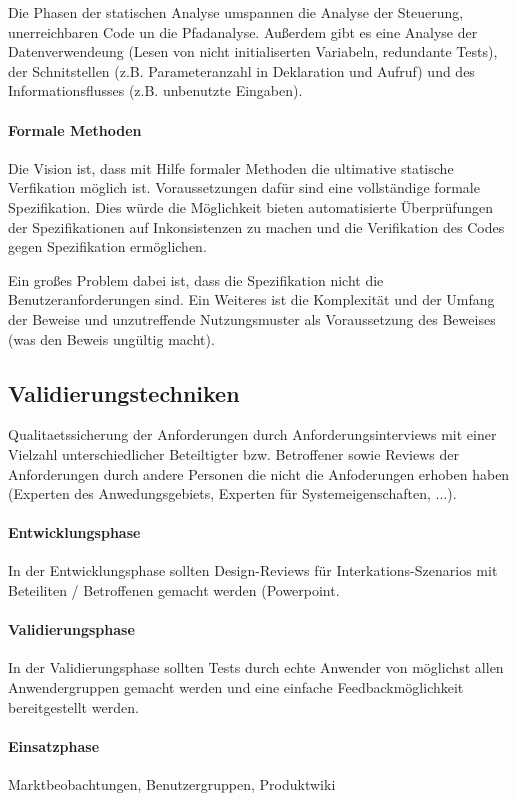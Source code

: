 Die Phasen der statischen Analyse umspannen die Analyse der Steuerung, unerreichbaren Code un die Pfadanalyse. Außerdem gibt es eine Analyse der Datenverwendeung (Lesen von nicht initialiserten Variabeln, redundante Tests), der Schnitstellen (z.B. Parameteranzahl in Deklaration und Aufruf) und des Informationsflusses (z.B. unbenutzte Eingaben).

\paragraph{Formale Methoden}
Die Vision ist, dass mit Hilfe formaler Methoden die ultimative statische Verfikation möglich ist. Voraussetzungen dafür sind eine vollständige formale Spezifikation. Dies würde die Möglichkeit bieten automatisierte Überprüfungen der Spezifikationen auf Inkonsistenzen zu machen und die Verifikation des Codes gegen Spezifikation ermöglichen.

Ein großes Problem dabei ist, dass die Spezifikation nicht die Benutzeranforderungen sind. Ein Weiteres ist die Komplexität und der Umfang der Beweise und unzutreffende Nutzungsmuster als Voraussetzung des Beweises (was den Beweis ungültig macht). 

\subsection{Validierungstechniken}
Qualitaetssicherung der Anforderungen durch Anforderungsinterviews mit einer Vielzahl unterschiedlicher Beteiltigter bzw. Betroffener sowie Reviews der Anforderungen durch andere Personen die nicht die Anfoderungen erhoben haben (Experten des Anwedungsgebiets, Experten für Systemeigenschaften, ...).

\paragraph{Entwicklungsphase}
In der Entwicklungsphase sollten Design-Reviews für Interkations-Szenarios mit Beteiliten / Betroffenen gemacht werden (Powerpoint.
\paragraph{Validierungsphase}
In der Validierungsphase sollten Tests durch echte Anwender von möglichst allen Anwendergruppen gemacht werden und eine einfache Feedbackmöglichkeit bereitgestellt werden. 
\paragraph{Einsatzphase}
Marktbeobachtungen, Benutzergruppen, Produktwiki

